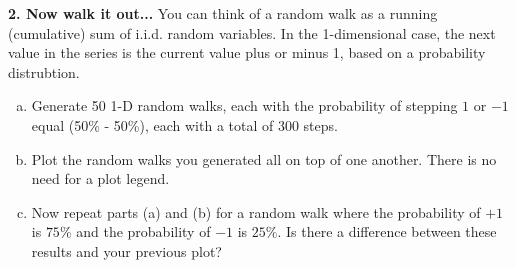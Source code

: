 \documentclass[11pt]{article}
\begin{document}
\noindent
\newline
\textbf{2. Now walk it out...}
You can think of a random walk as a running (cumulative) sum of
i.i.d. random variables. In the 1-dimensional case,
the next value in the series is the current value plus or minus 1, based on 
a probability distrubtion.
    
\begin{enumerate}[a.]
    \item  Generate 50 1-D random walks, 
    each with the probability of stepping $1$ or $-1$ equal (50\% - 50\%),
    each with a total of 300 steps.
    
    \item  Plot the random walks you generated all on top of one another.
    There is no need for a plot legend.
    
    \item  Now repeat parts (a) and (b) for a random walk where the
    probability of $+1$ is $75\%$ and the probability of $-1$ is $25\%$.
    Is there a difference between these results and your previous plot?
\end{enumerate}
\end{document}
